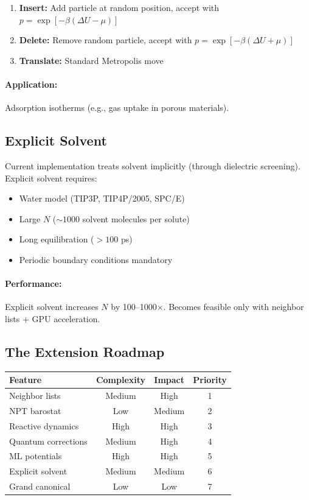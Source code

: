 \documentclass[11pt]{article}
\begin{document}
\begin{enumerate}
\item \textbf{Insert:} Add particle at random position, accept with $p = \exp[-\beta(\Delta U - \mu)]$
\item \textbf{Delete:} Remove random particle, accept with $p = \exp[-\beta(\Delta U + \mu)]$
\item \textbf{Translate:} Standard Metropolis move
\end{enumerate}

\paragraph{Application:}

Adsorption isotherms (e.g., gas uptake in porous materials).

\subsection{Explicit Solvent}

Current implementation treats solvent implicitly (through dielectric screening). Explicit solvent requires:

\begin{itemize}
\item Water model (TIP3P, TIP4P/2005, SPC/E)
\item Large $N$ ($\sim 1000$ solvent molecules per solute)
\item Long equilibration ($> 100$ ps)
\item Periodic boundary conditions mandatory
\end{itemize}

\paragraph{Performance:}

Explicit solvent increases $N$ by 100--1000$\times$. Becomes feasible only with neighbor lists + GPU acceleration.

\subsection{The Extension Roadmap}

\begin{center}
\begin{tabular}{lccc}
\toprule
Feature & Complexity & Impact & Priority \\
\midrule
Neighbor lists & Medium & High & 1 \\
NPT barostat & Low & Medium & 2 \\
Reactive dynamics & High & High & 3 \\
Quantum corrections & Medium & High & 4 \\
ML potentials & High & High & 5 \\
Explicit solvent & Medium & Medium & 6 \\
Grand canonical & Low & Low & 7 \\
\bottomrule
\end{tabular}
\end{center}
\end{document}

